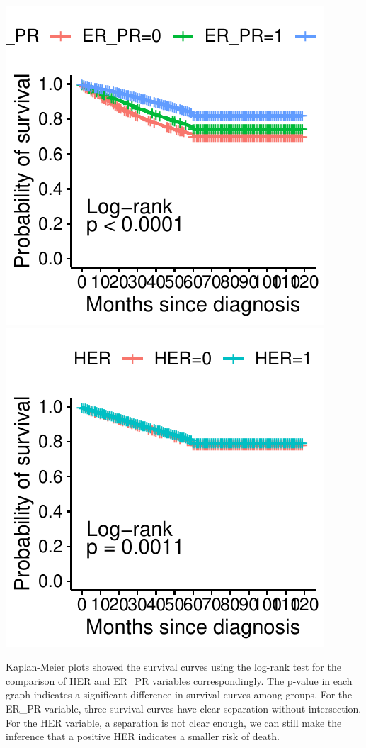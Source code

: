 \documentclass[
  12pt,
]{article}
\begin{document}
\includegraphics{report_files/figure-latex/unnamed-chunk-4-1.pdf}
\includegraphics{report_files/figure-latex/unnamed-chunk-4-2.pdf}

Kaplan-Meier plots showed the survival curves using the log-rank test
for the comparison of HER and ER\_PR variables correspondingly. The
p-value in each graph indicates a significant difference in survival
curves among groups. For the ER\_PR variable, three survival curves have
clear separation without intersection. For the HER variable, a
separation is not clear enough, we can still make the inference that a
positive HER indicates a smaller risk of death.
\end{document}

